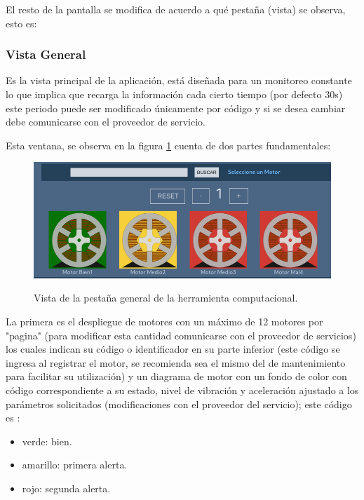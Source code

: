 \documentclass[12pt]{article}
\begin{document}
El resto de la pantalla se modifica de acuerdo a qué pestaña (vista) se observa,
esto es:

\subsubsection{Vista General}
Es la vista principal de la aplicación, está diseñada para un monitoreo constante
lo que implica que recarga la información cada cierto tiempo (por defecto 30s)
este periodo puede ser modificado únicamente por código y si se desea cambiar debe
comunicarse con el proveedor de servicio.

Esta ventana, se observa en la figura \ref{img:vistaGeneralManual}
cuenta de dos partes fundamentales:

    \begin{figure}[H]
		\centering
        \caption{Vista de la pestaña general de la herramienta computacional. }
        \includegraphics[width=\linewidth]{ManualUsuario/general.png}
        \label{img:vistaGeneralManual}
	\end{figure}

La primera es el despliegue de motores
con un máximo de 12 motores por "pagina" (para modificar esta cantidad comunicarse
con el proveedor de servicios) los cuales indican su código o identificador en
su parte inferior (este código se ingresa al registrar el motor, se recomienda sea
el mismo del de mantenimiento para facilitar su utilización) y un diagrama de
motor con un fondo de color con código correspondiente a su estado, nivel de
vibración y aceleración ajustado a los parámetros solicitados (modificaciones con
el proveedor del servicio); este código es :

\begin{itemize}
    \item  verde: bien.
    \item amarillo: primera alerta.
    \item rojo: segunda alerta.
\end{itemize}
\end{document}
